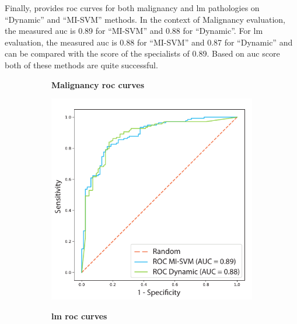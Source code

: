 \documentclass[journal,article,submit,moreauthors,pdftex, applsci]{Definitions/mdpi}
\begin{document}
Finally,  provides \ac{roc} curves for both malignancy and \ac{lm} pathologies on “Dynamic” and “MI-SVM” methods. In the context of Malignancy evaluation, the measured \ac{auc} is 0.89 for “MI-SVM” and 0.88 for “Dynamic”. For \ac{lm} evaluation, the measured \ac{auc} is 0.88 for “MI-SVM” and 0.87 for “Dynamic” and can be compared with the score of the specialists of 0.89. Based on \ac{auc} score both of these methods are quite successful.\par
\begin{figure}[H]
    \centering
    \begin{subfigure}{.45\linewidth}
        \centering
        \textbf{Malignancy \ac{roc} curves}\par
        \includegraphics[width=\linewidth]{Figures/Result_Malignancy.pdf}
    \end{subfigure} 
    \begin{subfigure}{.45\linewidth}
        \centering
        \textbf{\ac{lm} \ac{roc} curves}\par

\end{subfigure}
\end{figure}
\end{document}
